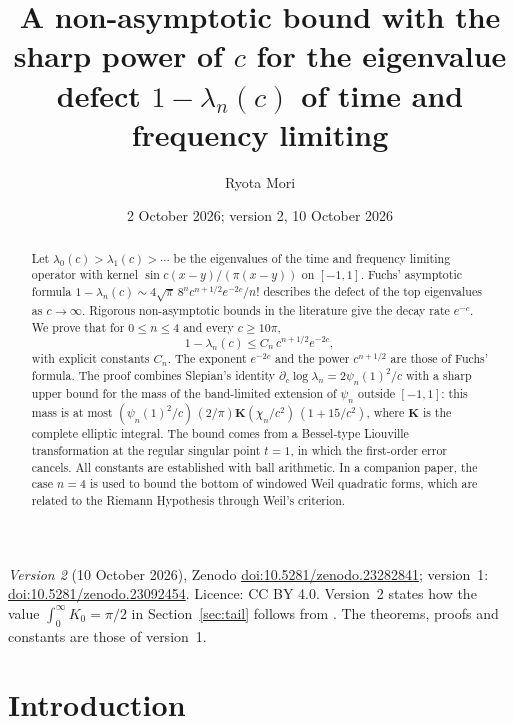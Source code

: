 \documentclass[11pt]{amsart}
\title[Sharp-power bounds for the prolate eigenvalue defect]{A non-asymptotic bound with the sharp power of $c$ for the eigenvalue defect $1-\lambda_n(c)$ of time and frequency limiting}
\author{Ryota Mori}
\date{2 October 2026; version 2, 10 October 2026}
\newcommand{\doi}[1]{\href{https://doi.org/#1}{doi:#1}}
\theoremstyle{remark}
\numberwithin{equation}{section}
\newcommand{\Kell}{\mathbf{K}}
\begin{document}
\begin{abstract}
Let $\lambda_0(c)>\lambda_1(c)>\cdots$ be the eigenvalues of the time and frequency limiting operator with kernel $\sin c(x-y)/(\pi(x-y))$ on $[-1,1]$. Fuchs' asymptotic formula $1-\lambda_n(c)\sim4\sqrt\pi\,8^n c^{n+1/2}e^{-2c}/n!$ describes the defect of the top eigenvalues as $c\to\infty$. Rigorous non-asymptotic bounds in the literature give the decay rate $e^{-c}$. We prove that for $0\le n\le4$ and every $c\ge10\pi$,
\[
1-\lambda_n(c)\le C_n\,c^{n+1/2}e^{-2c},
\]
with explicit constants $C_n$. The exponent $e^{-2c}$ and the power $c^{n+1/2}$ are those of Fuchs' formula. The proof combines Slepian's identity $\partial_c\log\lambda_n=2\psi_n(1)^2/c$ with a sharp upper bound for the mass of the band-limited extension of $\psi_n$ outside $[-1,1]$: this mass is at most $(\psi_n(1)^2/c)\,(2/\pi)\Kell(\chi_n/c^2)\,(1+15/c^2)$, where $\Kell$ is the complete elliptic integral. The bound comes from a Bessel-type Liouville transformation at the regular singular point $t=1$, in which the first-order error cancels. All constants are established with ball arithmetic. In a companion paper, the case $n=4$ is used to bound the bottom of windowed Weil quadratic forms, which are related to the Riemann Hypothesis through Weil's criterion.
\end{abstract}

\maketitle

\begin{sloppypar}
\noindent\textit{Version 2} (10 October 2026), Zenodo \doi{10.5281/zenodo.23282841}; version~1: \doi{10.5281/zenodo.23092454}. Licence: CC BY 4.0. Version~2 states how the value $\int_0^\infty K_0=\pi/2$ in Section~\ref{sec:tail} follows from \cite[10.32.9]{DLMF}. The theorems, proofs and constants are those of version~1.
\end{sloppypar}

\begin{center}
\end{center}

\section{Introduction}
\end{document}
